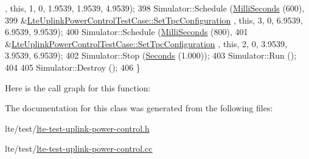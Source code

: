 \begin{DoxyCode}
      , \textcolor{keyword}{this}, 1, 0, 1.9539, 1.9539, 4.9539);
398   Simulator::Schedule (\hyperlink{group__timecivil_gaf26127cf4571146b83a92ee18679c7a9}{MilliSeconds} (600),
399                        &\hyperlink{classLteUplinkPowerControlTestCase_a91e2e46a5fa22677a33d5328ac9789b8}{LteUplinkPowerControlTestCase::SetTpcConfiguration}
      , \textcolor{keyword}{this}, 3, 0, 6.9539, 6.9539, 9.9539);
400   Simulator::Schedule (\hyperlink{group__timecivil_gaf26127cf4571146b83a92ee18679c7a9}{MilliSeconds} (800),
401                        &\hyperlink{classLteUplinkPowerControlTestCase_a91e2e46a5fa22677a33d5328ac9789b8}{LteUplinkPowerControlTestCase::SetTpcConfiguration}
      , \textcolor{keyword}{this}, 2, 0, 3.9539, 3.9539, 6.9539);
402   Simulator::Stop (\hyperlink{group__timecivil_ga33c34b816f8ff6628e33d5c8e9713b9e}{Seconds} (1.000));
403   Simulator::Run ();
404 
405   Simulator::Destroy ();
406 \}
\end{DoxyCode}


Here is the call graph for this function\+:




The documentation for this class was generated from the following files\+:\begin{DoxyCompactItemize}
\item 
lte/test/\hyperlink{lte-test-uplink-power-control_8h}{lte-\/test-\/uplink-\/power-\/control.\+h}\item 
lte/test/\hyperlink{lte-test-uplink-power-control_8cc}{lte-\/test-\/uplink-\/power-\/control.\+cc}\end{DoxyCompactItemize}
